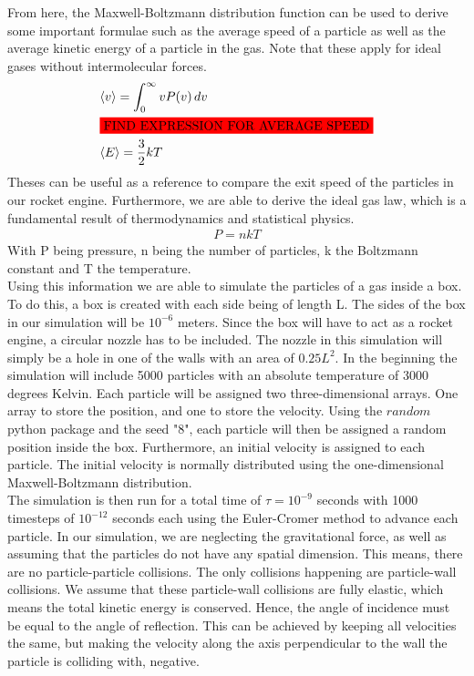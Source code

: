 \documentclass[reprint,english,notitlepage]{revtex4-2}
\begin{document}
From here, the Maxwell-Boltzmann distribution function can be used to derive some important formulae such as the average speed of a particle as well as the average kinetic energy of a particle in the gas.
Note that these apply for ideal gases without intermolecular forces.
\begin{align*}
    &\langle v \rangle = \int_{0}^{\infty} vP(v)\,dv\\
	&\colorbox{red}{FIND EXPRESSION FOR AVERAGE SPEED}\\
	&\langle E \rangle = \frac{3}{2}kT
\end{align*}
Theses can be useful as a reference to compare the exit speed of the particles in our rocket engine.
Furthermore, we are able to derive the ideal gas law, which is a fundamental result of thermodynamics and statistical physics.
\begin{align*}
    P = nkT
\end{align*}
With P being pressure, n being the number of particles, k the Boltzmann constant and T the temperature.\\

Using this information we are able to simulate the particles of a gas inside a box.
To do this, a box is created with each side being of length L. The sides of the box in our simulation will be $10^{-6}$ meters.
Since the box will have to act as a rocket engine, a circular nozzle has to be included.
The nozzle in this simulation will simply be a hole in one of the walls with an area of $0.25L^{2}$.
In the beginning the simulation will include 5000 particles with an absolute temperature of 3000 degrees Kelvin.
Each particle will be assigned two three-dimensional arrays. One array to store the position, and one to store the velocity.
Using the $random$ python package and the seed "8", each particle will then be assigned a random position inside the box.
Furthermore, an initial velocity is assigned to each particle. The initial velocity is normally distributed using the one-dimensional Maxwell-Boltzmann distribution.\\
The simulation is then run for a total time of $\tau = 10^{-9}$ seconds with 1000 timesteps of $10^{-12}$ seconds each using the Euler-Cromer method to advance each particle.
In our simulation, we are neglecting the gravitational force, as well as assuming that the particles do not have any spatial dimension.
This means, there are no particle-particle collisions. The only collisions happening are particle-wall collisions.
We assume that these particle-wall collisions are fully elastic, which means the total kinetic energy is conserved.
Hence, the angle of incidence must be equal to the angle of reflection.
This can be achieved by keeping all velocities the same, but making the velocity along the axis perpendicular to the wall the particle is colliding with, negative.
\end{document}
